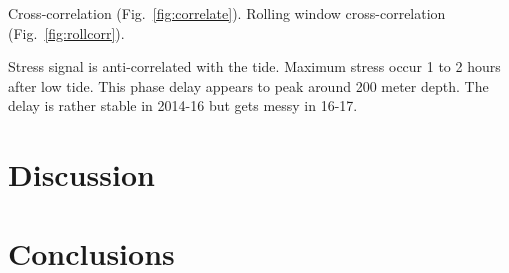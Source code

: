 \documentclass[utf8]{article}
\begin{document}
    Cross-correlation (Fig.~\ref{fig:correlate}).
    Rolling window cross-correlation (Fig.~\ref{fig:rollcorr}).

    Stress signal is anti-correlated with the tide.
    Maximum stress occur 1 to 2 hours after low tide.
    This phase delay appears to peak around 200 meter depth.
    The delay is rather stable in 2014-16 but gets messy in 16-17.


\section{Discussion}


\section{Conclusions}



\end{document}
